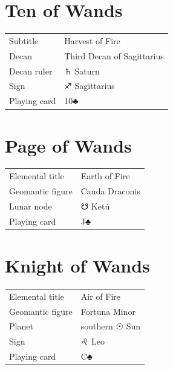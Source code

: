 \newpage
\section*{Ten of Wands}

\begin{center}
\end{center}

\vspace{4mm}
\noindent\begin{tabular}{@{}l@{\quad}l@{}}
Subtitle & Harvest of Fire \\
Decan & Third Decan of Sagittarius \\
Decan ruler & {\symbfont ♄} Saturn \\
Sign & {\symbfont ♐} Sagittarius \\
Playing card & 10♣ \\
\end{tabular}

\newpage
\section*{Page of Wands}

\begin{center}
\end{center}

\vspace{4mm}
\noindent\begin{tabular}{@{}l@{\quad}l@{}}
Elemental title & Earth of Fire \\
Geomantic figure & Cauda Draconis \\
Lunar node & {\symbfont ☋} Ketú \\
Playing card & J♣ \\
\end{tabular}

\newpage
\section*{Knight of Wands}

\begin{center}
\end{center}

\vspace{4mm}
\noindent\begin{tabular}{@{}l@{\quad}l@{}}
Elemental title & Air of Fire \\
Geomantic figure & Fortuna Minor \\
Planet & southern {\symbfont ☉} Sun \\
Sign & {\symbfont ♌} Leo \\
Playing card & C♣ \\
\end{tabular}

